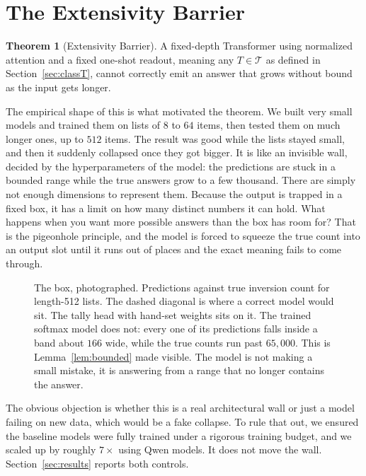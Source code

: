\documentclass[10pt]{article}
\theoremstyle{definition}
\newtheorem{theorem}{Theorem}
\begin{document}
\section{The Extensivity Barrier}
\label{sec:barrier}

\begin{theorem}[Extensivity Barrier]
\label{thm:barrier}
A fixed-depth Transformer using normalized attention and a fixed one-shot
readout, meaning any $T \in \mathcal{T}$ as defined in
Section~\ref{sec:classT}, cannot correctly emit an answer that grows
without bound as the input gets longer.
\end{theorem}

The empirical shape of this is what motivated the theorem. We built very
small models and trained them on lists of $8$ to $64$ items, then tested
them on much longer ones, up to $512$ items. The result was good while
the lists stayed small, and then it suddenly collapsed once they got
bigger. It is like an invisible wall, decided by the hyperparameters of
the model: the predictions are stuck in a bounded range while the true
answers grow to a few thousand. There are simply not enough dimensions to
represent them. Because the output is trapped in a fixed box, it has a
limit on how many distinct numbers it can hold. What happens when you want
more possible answers than the box has room for? That is the pigeonhole
principle, and the model is forced to squeeze the true count into an
output slot until it runs out of places and the exact meaning fails to
come through.


\begin{figure}[htbp]
\centering

\caption{The box, photographed. Predictions against true inversion count
for length-512 lists. The dashed diagonal is where a correct model would
sit. The tally head with hand-set weights sits on it. The trained softmax
model does not: every one of its predictions falls inside a band about
$166$ wide, while the true counts run past $65{,}000$. This is
Lemma~\ref{lem:bounded} made visible. The model is not making a small
mistake, it is answering from a range that no longer contains the
answer.}
\label{fig:scatter}
\end{figure}

The obvious objection is whether this is a real architectural wall or just
a model failing on new data, which would be a fake collapse. To rule that
out, we ensured the baseline models were fully trained under a rigorous
training budget, and we scaled up by roughly $7\times$ using Qwen models.
It does not move the wall. Section~\ref{sec:results} reports both
controls.
\end{document}
